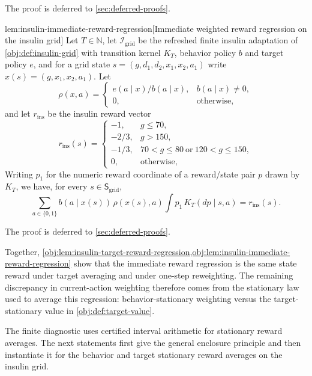 \documentclass[11pt]{article}
\begin{document}
The proof is deferred to \cref{sec:deferred-proofs}.

\begin{lemmav}{lem:insulin-immediate-reward-regression}[Immediate weighted reward regression on the insulin grid]
Let \(T\in\mathbb N\), let \(\mathcal I_{\mathrm{grid}}\) be the refreshed finite insulin adaptation of \cref{obj:def:insulin-grid} with transition kernel \(K_T\), behavior policy \(b\) and target policy \(e\), and for a grid state \(s=(g,d_1,d_2,x_1,x_2,a_1)\) write \(x(s)=(g,x_1,x_2,a_1)\). Let
\[
\rho(x,a)=\begin{cases}e(a\mid x)/b(a\mid x),&b(a\mid x)\ne0,\\0,&\text{otherwise},\end{cases}
\]
and let \(r_{\mathrm{ins}}\) be the insulin reward vector
\[
r_{\mathrm{ins}}(s)=
\begin{cases}
-1,&g\le70,\\
-2/3,&g>150,\\
-1/3,&70<g\le80\ \text{or}\ 120<g\le150,\\
0,&\text{otherwise},
\end{cases}
\]
Writing \(p_1\) for the numeric reward coordinate of a reward/state pair \(p\) drawn by \(K_T\), we have, for every \(s\in\mathsf S_{\mathrm{grid}}\),
\[
\sum_{a\in\{0,1\}}b(a\mid x(s))\,\rho(x(s),a)\int p_1\,K_T(dp\mid s,a)
=
r_{\mathrm{ins}}(s) .
\]
\end{lemmav}

The proof is deferred to \cref{sec:deferred-proofs}.

Together, \cref{obj:lem:insulin-target-reward-regression,obj:lem:insulin-immediate-reward-regression} show that the immediate reward regression is the same state reward under target averaging and under one-step reweighting. The remaining discrepancy in current-action weighting therefore comes from the stationary law used to average this regression: behavior-stationary weighting versus the target-stationary value in \cref{obj:def:target-value}.

The finite diagnostic uses certified interval arithmetic for stationary reward averages. The next statements first give the general enclosure principle and then instantiate it for the behavior and target stationary reward averages on the insulin grid.
\end{document}
